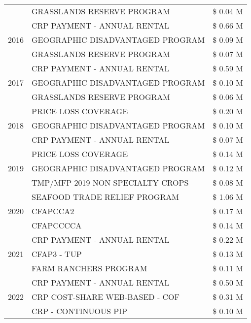 \begin{tabular}{llr}
 & GRASSLANDS RESERVE PROGRAM & \$ 0.04 M \\
\cline{1-3}
\multirow[t]{3}{*}{2016} & CRP PAYMENT - ANNUAL RENTAL & \$ 0.66 M \\
 & GEOGRAPHIC DISADVANTAGED PROGRAM & \$ 0.09 M \\
 & GRASSLANDS RESERVE PROGRAM & \$ 0.07 M \\
\cline{1-3}
\multirow[t]{3}{*}{2017} & CRP PAYMENT - ANNUAL RENTAL & \$ 0.59 M \\
 & GEOGRAPHIC DISADVANTAGED PROGRAM & \$ 0.10 M \\
 & GRASSLANDS RESERVE PROGRAM & \$ 0.06 M \\
\cline{1-3}
\multirow[t]{3}{*}{2018} & PRICE LOSS COVERAGE & \$ 0.20 M \\
 & GEOGRAPHIC DISADVANTAGED PROGRAM & \$ 0.10 M \\
 & CRP PAYMENT - ANNUAL RENTAL & \$ 0.07 M \\
\cline{1-3}
\multirow[t]{3}{*}{2019} & PRICE LOSS COVERAGE & \$ 0.14 M \\
 & GEOGRAPHIC DISADVANTAGED PROGRAM & \$ 0.12 M \\
 & TMP/MFP 2019 NON SPECIALTY CROPS & \$ 0.08 M \\
\cline{1-3}
\multirow[t]{3}{*}{2020} & SEAFOOD TRADE RELIEF PROGRAM & \$ 1.06 M \\
 & CFAPCCA2 & \$ 0.17 M \\
 & CFAPCCCCA & \$ 0.14 M \\
\cline{1-3}
\multirow[t]{3}{*}{2021} & CRP PAYMENT - ANNUAL RENTAL & \$ 0.22 M \\
 & CFAP3 - TUP & \$ 0.13 M \\
 & FARM RANCHERS PROGRAM & \$ 0.11 M \\
\cline{1-3}
\multirow[t]{3}{*}{2022} & CRP PAYMENT - ANNUAL RENTAL & \$ 0.50 M \\
 & CRP COST-SHARE WEB-BASED - COF & \$ 0.31 M \\
 & CRP - CONTINUOUS PIP & \$ 0.10 M \\
\cline{1-3}
\bottomrule
\end{tabular}
